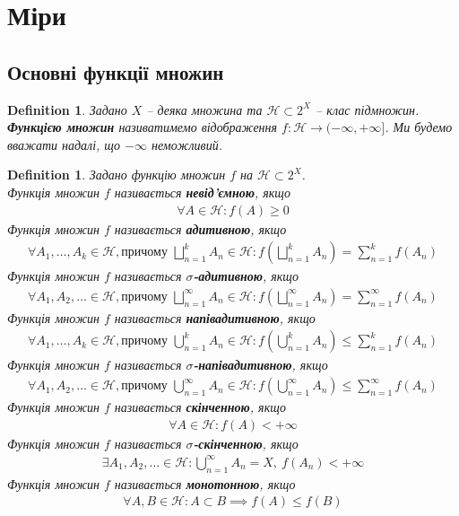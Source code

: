 \documentclass[a4paper, 10pt]{article}
\theoremstyle{theoremdd}
\newtheorem{definition}[theorem]{Definition}
\begin{document}
\section{Міри}
\subsection{Основні функції множин}
\begin{definition}
Задано $X$ -- деяка множина та $\mathcal{H} \subset 2^X$ -- клас підмножин.\\
\textbf{Функцією множин} називатимемо відображення $f \colon \mathcal{H} \to (-\infty,+\infty]$. Ми будемо вважати надалі, що $-\infty$ неможливий.
\end{definition}

\begin{definition}
Задано функцію множин $f$ на $\mathcal{H} \subset 2^X$.\\
Функція множин $f$ називається \textbf{невід'ємною}, якщо
\begin{align*}
\forall A \in \mathcal{H}: f(A) \geq 0
\end{align*}
Функція множин $f$ називається \textbf{адитивною}, якщо
\begin{align*}
\forall A_1,\dots,A_k \in \mathcal{H}, \text{причому } \bigsqcup_{n=1}^k A_n \in \mathcal{H}: f\left( \bigsqcup_{n=1}^k A_n \right) = \sum_{n=1}^k f(A_n)
\end{align*}
Функція множин $f$ називається \textbf{$\sigma$-адитивною}, якщо
\begin{align*}
\forall A_1,A_2,\dots \in \mathcal{H}, \text{причому } \bigsqcup_{n=1}^\infty A_n \in \mathcal{H}: f\left( \bigsqcup_{n=1}^\infty A_n \right) = \sum_{n=1}^\infty f(A_n)
\end{align*}
Функція множин $f$ називається \textbf{напівадитивною}, якщо
\begin{align*}
\forall A_1,\dots,A_k \in \mathcal{H}, \text{причому } \bigcup_{n=1}^k A_n \in \mathcal{H}: f\left( \bigcup_{n=1}^k A_n \right) \leq \sum_{n=1}^k f(A_n)
\end{align*}
Функція множин $f$ називається \textbf{$\sigma$-напівадитивною}, якщо
\begin{align*}
\forall A_1,A_2,\dots \in \mathcal{H}, \text{причому } \bigcup_{n=1}^\infty A_n \in \mathcal{H}: f\left( \bigcup_{n=1}^\infty A_n \right) \leq \sum_{n=1}^\infty f(A_n)
\end{align*}
Функція множин $f$ називається \textbf{скінченною}, якщо
\begin{align*}
\forall A \in \mathcal{H}: f(A) < +\infty
\end{align*}
Функція множин $f$ називається \textbf{$\sigma$-скінченною}, якщо
\begin{align*}
\exists A_1,A_2, \dots \in \mathcal{H}: \bigcup_{n=1}^\infty A_n = X,\ f(A_n) < +\infty
\end{align*}
Функція множин $f$ називається \textbf{монотонною}, якщо
\begin{align*}
\forall A,B \in \mathcal{H}: A \subset B \implies f(A) \leq f(B)
\end{align*} 
\end{definition}
\end{document}

